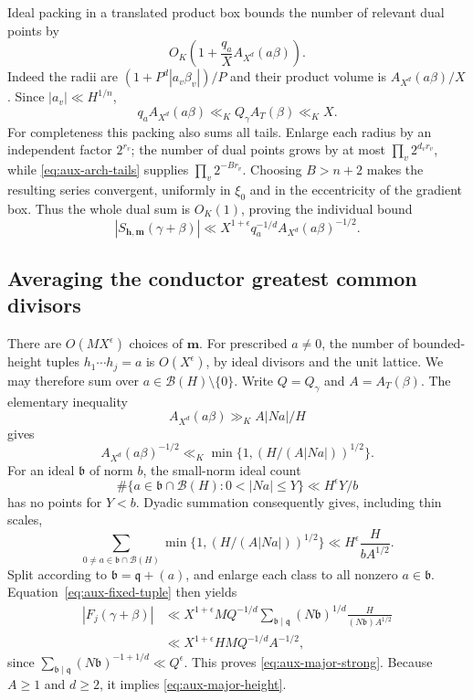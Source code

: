 \documentclass[11pt,reqno]{amsart}
\numberwithin{equation}{section}
\theoremstyle{definition}
\begin{document}
Ideal packing in a translated product box bounds the number of relevant
dual points by
\[
 O_K\left(1+\frac{q_a}{X}A_{X^d}(a\beta)\right).
\]
Indeed the radii are $(1+P^d|a_v\beta_v|)/P$ and their product volume is
$A_{X^d}(a\beta)/X$.  Since $|a_v|\ll H^{1/n}$,
\[
 q_aA_{X^d}(a\beta)\ll_K Q_\gamma A_T(\beta)\ll_KX.
\]
For completeness this packing also sums all tails.  Enlarge each radius
by an independent factor $2^{r_v}$; the number of dual points grows by at
most $\prod_v2^{d_vr_v}$, while \eqref{eq:aux-arch-tails} supplies
$\prod_v2^{-Br_v}$.  Choosing $B>n+2$ makes the resulting series convergent,
uniformly in $\xi_0$ and in the eccentricity of the gradient box.
Thus the whole dual sum is $O_K(1)$, proving the individual bound
\begin{equation}\label{eq:aux-fixed-tuple}
 |S_{\mathbf h,\mathbf m}(\gamma+\beta)|
 \ll X^{1+\epsilon}q_a^{-1/d}A_{X^d}(a\beta)^{-1/2}.
\end{equation}

\subsection{Averaging the conductor greatest common divisors}

There are $O(MX^\epsilon)$ choices of $\mathbf m$.
For prescribed $a\ne0$, the number of bounded-height tuples
$h_1\cdots h_j=a$ is $O(X^\epsilon)$, by ideal divisors and the unit
lattice.  We may therefore sum over $a\in\mathcal B(H)\setminus\{0\}$.
Write $Q=Q_\gamma$ and $A=A_T(\beta)$.  The elementary inequality
\[
 A_{X^d}(a\beta)\gg_K A|Na|/H
\]
gives
\[
 A_{X^d}(a\beta)^{-1/2}
 \ll_K\min\{1,(H/(A|Na|))^{1/2}\}.
\]
For an ideal $\mathfrak b$ of norm $b$, the small-norm ideal count
\[
 \#\{a\in\mathfrak b\cap\mathcal B(H):0<|Na|\le Y\}
       \ll H^\epsilon Y/b
\]
has no points for $Y<b$.  Dyadic summation consequently gives, including
thin scales,
\[
 \sum_{0\ne a\in\mathfrak b\cap\mathcal B(H)}
       \min\{1,(H/(A|Na|))^{1/2}\}
 \ll H^\epsilon\frac{H}{bA^{1/2}}.
\]
Split according to $\mathfrak b=\mathfrak q+(a)$, and enlarge each class
to all nonzero $a\in\mathfrak b$.  Equation~\eqref{eq:aux-fixed-tuple} then
yields
\begin{align*}
 |F_j(\gamma+\beta)|
 &\ll X^{1+\epsilon}M Q^{-1/d}
       \sum_{\mathfrak b\mid\mathfrak q}(N\mathfrak b)^{1/d}
         \frac{H}{(N\mathfrak b)A^{1/2}}\\
 &\ll X^{1+\epsilon}HM Q^{-1/d}A^{-1/2},
\end{align*}
since $\sum_{\mathfrak b\mid\mathfrak q}(N\mathfrak b)^{-1+1/d}
\ll Q^\epsilon$.  This proves \eqref{eq:aux-major-strong}.
Because $A\ge1$ and $d\ge2$, it implies \eqref{eq:aux-major-height}.
\end{document}
